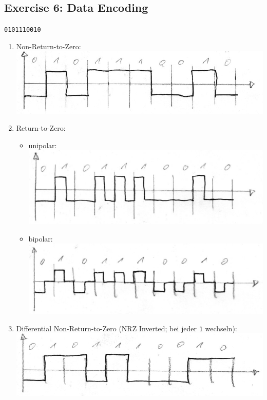 \documentclass[10pt,a4paper]{scrartcl}
\begin{document}
\subsection*{Exercise 6: Data Encoding}
\texttt{0101110010}
\begin{enumerate}
\item Non-Return-to-Zero: \\\includegraphics{a3e6_1.jpg}
\item Return-to-Zero:
\begin{itemize}
\item unipolar: \\\includegraphics{a3e6_2a.jpg}
\item bipolar: \\\includegraphics{a3e6_2b.jpg}
\end{itemize}
\item Differential Non-Return-to-Zero (NRZ Inverted; bei jeder \texttt{1} wechseln):\\ \includegraphics{a3e6_3.jpg}

\end{enumerate}
\end{document}
